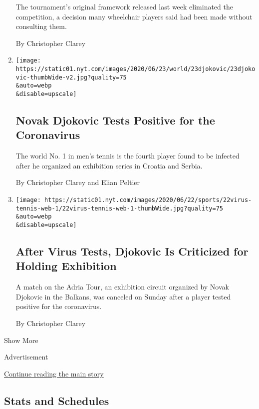 \begin{enumerate}
  The tournament's original framework released last week eliminated the
  competition, a decision many wheelchair players said had been made
  without consulting them.

  By Christopher Clarey
\item
  \href{/2020/06/23/sports/tennis/novak-djokovic-coronavirus.html}{}

  \texttt{[image: https://static01.nyt.com/images/2020/06/23/world/23djokovic/23djokovic-thumbWide-v2.jpg?quality=75\\\&auto=webp\\\&disable=upscale]}

  \hypertarget{novak-djokovic-tests-positive-for-the-coronavirus}{%
  \subsection{Novak Djokovic Tests Positive for the
  Coronavirus}\label{novak-djokovic-tests-positive-for-the-coronavirus}}

  The world No. 1 in men's tennis is the fourth player found to be
  infected after he organized an exhibition series in Croatia and
  Serbia.

  By Christopher Clarey and Elian Peltier
\item
  \href{/2020/06/22/sports/tennis/djokovic-exhibition-positive-tests-coronavirus.html}{}

  \texttt{[image: https://static01.nyt.com/images/2020/06/22/sports/22virus-tennis-web-1/22virus-tennis-web-1-thumbWide.jpg?quality=75\\\&auto=webp\\\&disable=upscale]}

  \hypertarget{after-virus-tests-djokovic-is-criticized-for-holding-exhibition}{%
  \subsection{After Virus Tests, Djokovic Is Criticized for Holding
  Exhibition}\label{after-virus-tests-djokovic-is-criticized-for-holding-exhibition}}

  A match on the Adria Tour, an exhibition circuit organized by Novak
  Djokovic in the Balkans, was canceled on Sunday after a player tested
  positive for the coronavirus.

  By Christopher Clarey
\end{enumerate}

Show More

Advertisement

\protect\hyperlink{after-mid1}{Continue reading the main story}

\hypertarget{stats-and-schedules}{%
\subsection{Stats and Schedules}\label{stats-and-schedules}}

